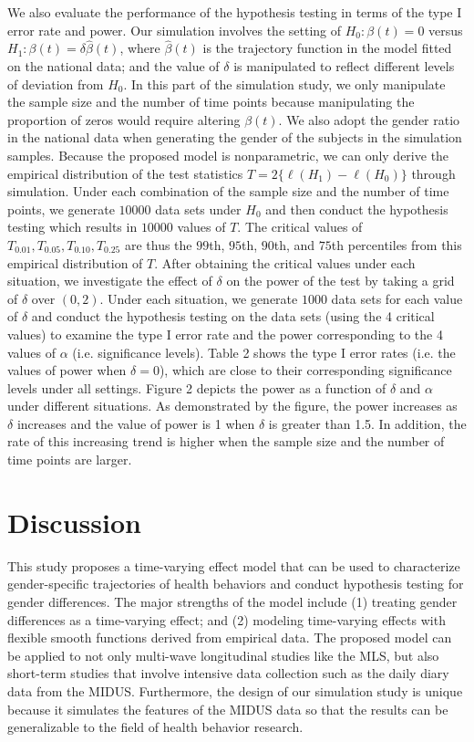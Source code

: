 We also evaluate the performance of the hypothesis testing in
terms of the type I error rate and power. Our simulation involves
the setting of $H_{0}: \beta(t)=0$ versus $H_{1}:
\beta(t)=\delta\hat{\beta}(t)$, where $\hat{\beta}(t)$ is the
trajectory function in the model fitted on the national data; and
the value of $\delta$ is manipulated to reflect different levels
of deviation from $H_0$. In this part of the simulation study, we
only manipulate the sample size and the number of time points
because manipulating the proportion of zeros would require
altering $\beta(t)$. We also adopt the gender ratio in the
national data when generating the gender of the subjects in the
simulation samples. Because the proposed model is nonparametric,
we can only derive the empirical distribution of the test
statistics $T=2\{\ell(H_{1})-\ell(H_{0})\}$ through simulation.
Under each combination of the sample size and the number of time
points, we generate $10000$ data sets under $H_0$ and then conduct
the hypothesis testing which results in $10000$ values of $T$. The
critical values of $T_{0.01}, T_{0.05}, T_{0.10}, T_{0.25}$ are
thus the $99$th, $95$th, $90$th, and $75$th percentiles from this
empirical distribution of $T$. After obtaining the critical values
under each situation, we investigate the effect of $\delta$ on the
power of the test by taking a grid of $\delta$ over $(0,2)$. Under
each situation, we generate $1000$ data sets for each value of
$\delta$ and conduct the hypothesis testing on the data sets
(using the 4 critical values) to examine the type I error rate and
the power corresponding to the 4 values of $\alpha$ (i.e.
significance levels). Table 2 shows the type I error rates (i.e.
the values of power when $\delta=0$), which are close to their
corresponding significance levels under all settings. Figure 2
depicts the power as a function of $\delta$ and $\alpha$ under
different situations. As demonstrated by the figure, the power
increases as $\delta$ increases and the value of power is 1 when
$\delta$ is greater than 1.5. In addition, the rate of this
increasing trend is higher when the sample size and the number of
time points are larger.

\section{Discussion}

This study proposes a time-varying effect model that can be used
to characterize gender-specific trajectories of health behaviors
and conduct hypothesis testing for gender differences. The major
strengths of the model include (1) treating gender differences as
a time-varying effect; and (2) modeling time-varying effects with
flexible smooth functions derived from empirical data. The
proposed model can be applied to not only multi-wave longitudinal
studies like the MLS, but also short-term studies that involve
intensive data collection such as the daily diary data from the
MIDUS. Furthermore, the design of our simulation study is unique
because it simulates the features of the MIDUS data so that the
results can be generalizable to the field of health behavior
research.

